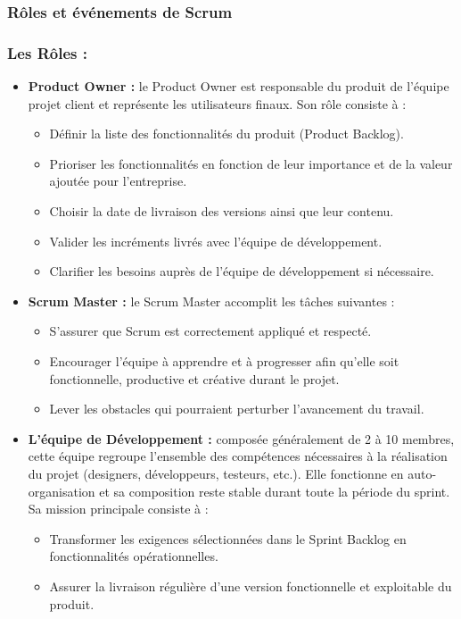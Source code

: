 \subsubsection{Rôles et événements de Scrum}
\subsubsection*{ Les Rôles :}
\begin{itemize}
  \item \textbf{Product Owner :} le Product Owner est responsable du produit de l'équipe projet client et représente les utilisateurs finaux. Son rôle consiste à :
  \begin{itemize}
    \item Définir la liste des fonctionnalités du produit (Product Backlog).
    \item Prioriser les fonctionnalités en fonction de leur importance et de la valeur ajoutée pour l'entreprise.
    \item Choisir la date de livraison des versions ainsi que leur contenu.
    \item Valider les incréments livrés avec l'équipe de développement.
    \item Clarifier les besoins auprès de l'équipe de développement si nécessaire.
  \end{itemize}

  \item \textbf{Scrum Master :} le Scrum Master accomplit les tâches suivantes :
  \begin{itemize}
    \item S'assurer que Scrum est correctement appliqué et respecté.
    \item Encourager l'équipe à apprendre et à progresser afin qu'elle soit fonctionnelle, productive et créative durant le projet.
    \item Lever les obstacles qui pourraient perturber l'avancement du travail.
  \end{itemize}

  \item \textbf{L'équipe de Développement :} composée généralement de 2 à 10 membres, cette équipe regroupe l'ensemble des compétences nécessaires à la réalisation du projet (designers, développeurs, testeurs, etc.). Elle fonctionne en auto-organisation et sa composition reste stable durant toute la période du sprint. Sa mission principale consiste à :
  \begin{itemize}
    \item Transformer les exigences sélectionnées dans le Sprint Backlog en fonctionnalités opérationnelles.
    \item Assurer la livraison régulière d'une version fonctionnelle et exploitable du produit.
  \end{itemize}
\end{itemize}
